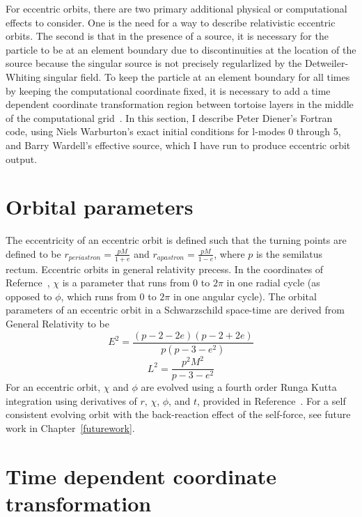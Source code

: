 For eccentric orbits, there are two primary additional physical or computational effects to consider. One is the need for a way to describe relativistic eccentric orbits. The second is that in the presence of a source, it is necessary for the particle to be at an element boundary due to discontinuities at the location of the source because the singular source is not precisely regularlized by the Detweiler-Whiting singular field. To keep the particle at an element boundary for all times by keeping the computational coordinate fixed, it is necessary to add a time dependent coordinate transformation region between tortoise layers in the middle of the computational grid~\cite{time_dependent_coordinate_transform}. In this section, I describe Peter Diener's Fortran code, using Niels Warburton's exact initial conditions for l-modes 0 through 5, and Barry Wardell's effective source, which I have run to produce eccentric orbit output. 

\section{Orbital parameters}

The eccentricity of an eccentric orbit is defined such that the turning points are defined to be $r_{periastron}=\frac{pM}{1+e}$ and $r_{apastron}=\frac{pM}{1-e}$, where $p$ is the semilatus rectum. Eccentric orbits in general relativity precess. In the coordinates of Refernce~\cite{pound_poisson}, $\chi$ is a parameter that runs from $0$ to $2\pi$ in one radial cycle (as opposed to $\phi$, which runs from $0$ to $2\pi$ in one angular cycle). The orbital parameters of an eccentric orbit in a Schwarzschild space-time are derived from General Relativity to be 
\begin{equation}
  E^2=\frac{(p-2-2e)(p-2+2e)}{p(p-3-e^2)}
\end{equation}
\begin{equation}
  L^2=\frac{p^2M^2}{p-3-e^2}
\end{equation}
For an eccentric orbit, $\chi$ and $\phi$ are evolved using a fourth order Runga Kutta integration using derivatives of $r$, $\chi$, $\phi$, and $t$, provided in Reference~\cite{pound_poisson}. For a self consistent evolving orbit with the back-reaction effect of the self-force, see future work in Chapter~\ref{futurework}. 


\section{Time dependent coordinate transformation}

